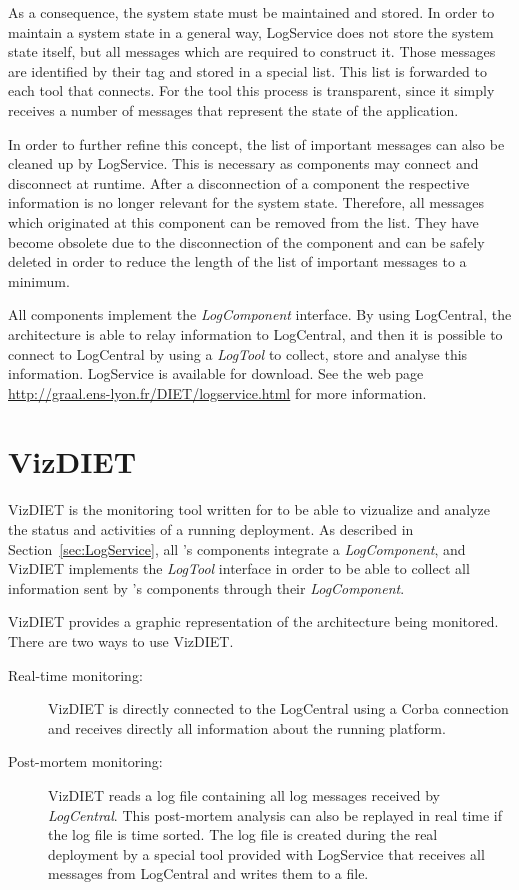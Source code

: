 \begin{description}
    As a consequence, the system state must be maintained and stored.  In order
    to maintain a system state in a general way, LogService does not store the
    system state itself, but all messages which are required to construct it.
    Those messages are identified by their tag and stored in a special list.
    This list is forwarded to each tool that connects.  For the tool this
    process is transparent, since it simply receives a number of messages that
    represent the state of the application.
    \label{ref:LogService_system_stats}

    In order to further refine this concept, the list of important messages can
    also be cleaned up by LogService. This is necessary as components may
    connect and disconnect at runtime. After a disconnection of a component the
    respective information is no longer relevant for the system state.
    Therefore, all messages which originated at this component can be removed
    from the list. They have become obsolete due to the disconnection of the
    component and can be safely deleted in order to reduce the length of the
    list of important messages to a minimum.
    \end{description}

All \diet components implement the \textit{LogComponent} interface. By using
LogCentral, the \diet architecture is able to relay information to LogCentral,
and then it is possible to connect to LogCentral by using a \textit{LogTool} to
collect, store and analyse this information. LogService is available for
download. See the web page \url{http://graal.ens-lyon.fr/DIET/logservice.html}
for more information.

\section{VizDIET}
\label{sec:VizDIET}
VizDIET is the monitoring tool written for \diet to be able to vizualize and
analyze the status and activities of a running \diet deployment. As described
in Section~\ref{sec:LogService}, all \diet's components integrate a
\textit{LogComponent}, and VizDIET implements the \textit{LogTool} interface in
order to be able to collect all information sent by \diet's components through
their \textit{LogComponent}.

VizDIET provides a graphic representation of the \diet architecture being
monitored. There are two ways to use VizDIET.
\begin{description}
\item[Real-time monitoring:] VizDIET is directly connected to the LogCentral
  using a Corba connection and receives directly all information about the
  running \diet platform.

\item[Post-mortem monitoring:] VizDIET reads a log file containing all log
  messages received by \textit{LogCentral}.  This post-mortem analysis can also
  be replayed in  real time if the log file is time sorted.  The log file is
  created during the real deployment by a special tool provided with LogService
  that receives all messages from LogCentral and writes them to a file.
\end{description}

